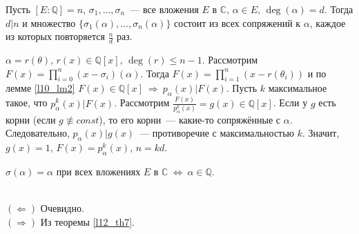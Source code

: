 \begin{theorem} \label{l12_th7}
	Пусть $[E \colon \mathbb{Q}] = n, \, \sigma_1,\dots,\sigma_n$ — все вложения $E$ в $\mathbb{C}, \, \alpha \in E, \, \deg(\alpha) = d$. Тогда $d \vert n$ и множество $\{ \sigma_1(\alpha),\dots,\sigma_n(\alpha) \}$ состоит из всех сопряжений к $\alpha$, каждое из которых повторяется $\displaystyle \frac{n}{d}$ раз.
\end{theorem}
\begin{pf}
	$\alpha = r(\theta), \, r(x) \in \mathbb{Q}[x], \, \deg(r) \leq n-1$.
	Рассмотрим $\displaystyle F(x) = \prod\limits_{i=0}^n (x-\sigma_i)(\alpha)$. Тогда $\displaystyle F(x) = \prod\limits_{i=1}^n (x-r(\theta_i))$ и по лемме \ref{l10_lm2} $F(x) \in \mathbb{Q}[x] \ \Rightarrow \ p_\alpha(x) \vert F(x)$.
	Пусть $k$ максимальное такое, что $p_\alpha^k(x) \vert F(x)$. Рассмотрим $\displaystyle \frac{F(x)}{p_\alpha^k(x)} = g(x) \in \mathbb{Q}[x]$.
	Если у $g$ есть корни (если $g \not\equiv const$), то его корни — какие-то сопряжённые с $\alpha$. Следовательно, $p_\alpha(x) \vert g(x)$ — противоречие с максимальностью $k$.
	Значит, $g(x)=1,\,F(x)=p_\alpha^k(x),\,n=kd$.
\end{pf}

\begin{corollary}
	$\sigma(\alpha) = \alpha$ при всех вложениях $E$ в $\mathbb{C} \ \Leftrightarrow \ \alpha \in \mathbb{Q}$.
\end{corollary}
\begin{pf}~\\
	$(\Leftarrow)$ Очевидно.\\
	$(\Rightarrow)$ Из теоремы \ref{l12_th7}.
\end{pf}